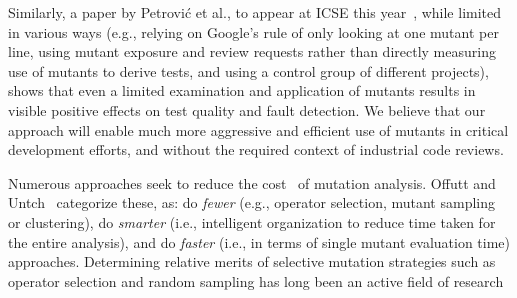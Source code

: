 Similarly, a paper by Petrovi\'c et al., to appear at ICSE this
year~\cite{MutImpTest}, while limited in various ways (e.g., relying on Google's rule of only looking at one
mutant per line, using mutant exposure and review requests rather than
directly measuring use of mutants to derive tests, and using a control group of different projects), shows that even a limited examination and
application of mutants results in
visible positive effects on test quality and fault detection.  We
believe that our approach will enable much more aggressive and efficient use of
mutants in critical development efforts, and without the required
context of industrial code reviews.

Numerous approaches seek to reduce the cost~\cite{jia2011analysis} of mutation
analysis. Offutt and Untch~\cite{offutt2001mutation} categorize these,
as: do \textit{fewer} (e.g., operator selection, mutant sampling or clustering),
do \textit{smarter} (i.e., intelligent organization to reduce time taken for the
entire analysis), and do \textit{faster} (i.e., in terms of single mutant
evaluation time) approaches. 
Determining relative merits of selective mutation strategies such as operator
selection and random sampling has long been an active field of
research~\cite{wong1995reducing,mresa1999efficiency,zhang2010isoperator,gopinath2016measuring,shin2016theoretical,lindstrom2015redundant} 
